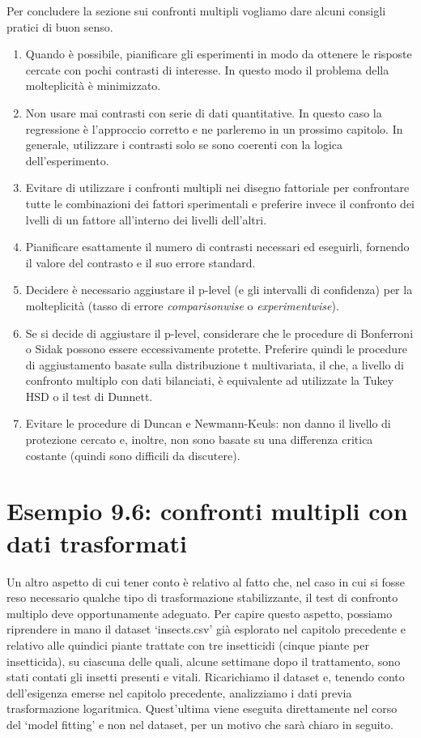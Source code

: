\documentclass[
  12pt,
]{book}
\providecommand{\tightlist}{%
  \setlength{\itemsep}{0pt}\setlength{\parskip}{0pt}}
\begin{document}
Per concludere la sezione sui confronti multipli vogliamo dare alcuni consigli pratici di buon senso.

\begin{enumerate}
\def\labelenumi{\arabic{enumi}.}
\tightlist
\item
  Quando è possibile, pianificare gli esperimenti in modo da ottenere le risposte cercate con pochi contrasti di interesse. In questo modo il problema della molteplicità è minimizzato.
\item
  Non usare mai contrasti con serie di dati quantitative. In questo caso la regressione è l'approccio corretto e ne parleremo in un prossimo capitolo. In generale, utilizzare i contrasti solo se sono coerenti con la logica dell'esperimento.
\item
  Evitare di utilizzare i confronti multipli nei disegno fattoriale per confrontare tutte le combinazioni dei fattori sperimentali e preferire invece il confronto dei lvelli di un fattore all'interno dei livelli dell'altri.
\item
  Pianificare esattamente il numero di contrasti necessari ed eseguirli, fornendo il valore del contrasto e il suo errore standard.
\item
  Decidere è necessario aggiustare il p-level (e gli intervalli di confidenza) per la molteplicità (tasso di errore \emph{comparisonwise} o \emph{experimentwise}).
\item
  Se si decide di aggiustare il p-level, considerare che le procedure di Bonferroni o Sidak possono essere eccessivamente protette. Preferire quindi le procedure di aggiustamento basate sulla distribuzione t multivariata, il che, a livello di confronto multiplo con dati bilanciati, è equivalente ad utilizzate la Tukey HSD o il test di Dunnett.
\item
  Evitare le procedure di Duncan e Newmann-Keuls: non danno il livello di protezione cercato e, inoltre, non sono basate su una differenza critica costante (quindi sono difficili da discutere).
\end{enumerate}

\hypertarget{esempio-9.6-confronti-multipli-con-dati-trasformati}{%
\section{Esempio 9.6: confronti multipli con dati trasformati}\label{esempio-9.6-confronti-multipli-con-dati-trasformati}}

Un altro aspetto di cui tener conto è relativo al fatto che, nel caso in cui si fosse reso necessario qualche tipo di trasformazione stabilizzante, il test di confronto multiplo deve opportunamente adeguato. Per capire questo aspetto, possiamo riprendere in mano il dataset `insects.csv' già esplorato nel capitolo precedente e relativo alle quindici piante trattate con tre insetticidi (cinque piante per insetticida), su ciascuna delle quali, alcune settimane dopo il trattamento, sono stati contati gli insetti presenti e vitali. Ricarichiamo il dataset e, tenendo conto dell'esigenza emerse nel capitolo precedente, analizziamo i dati previa trasformazione logaritmica. Quest'ultima viene eseguita direttamente nel corso del `model fitting' e non nel dataset, per un motivo che sarà chiaro in seguito.
\end{document}
